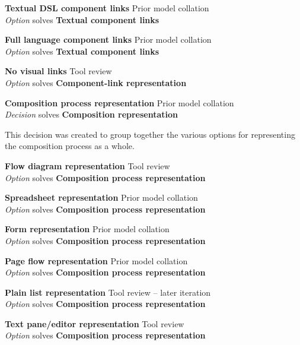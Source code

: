 \textbf{Textual DSL component links} \hfill Prior model collation \cite{Aghaee2012} \\ \emph{Option} \hfill solves \textbf{Textual component links}

\textbf{Full language component links} \hfill Prior model collation \cite{Fischer2009} \\ \emph{Option} \hfill solves \textbf{Textual component links}

\textbf{No visual links} \hfill Tool review \\ \emph{Option} \hfill solves \textbf{Component-link representation}
		
\textbf{Composition process representation} \hfill Prior model collation \\ \emph{Decision} \hfill solves \textbf{Composition representation}

This decision was created to group together the various options for representing the composition process as a whole.

\textbf{Flow diagram representation} \hfill Tool review \\ \emph{Option} \hfill solves \textbf{Composition process representation}

\textbf{Spreadsheet representation} \hfill Prior model collation \cite{Aghaee2012,Minhas2012,Fischer2009} \\ \emph{Option} \hfill solves \textbf{Composition process representation}


\textbf{Form representation} \hfill Prior model collation \cite{Aghaee2012} \\ \emph{Option} \hfill solves \textbf{Composition process representation}

\textbf{Page flow representation} \hfill Prior model collation \cite{Pietschmann2010} \\ \emph{Option} \hfill solves \textbf{Composition process representation}

\textbf{Plain list representation} \hfill Tool review  -- later iteration \\ \emph{Option} \hfill solves \textbf{Composition process representation}

\textbf{Text pane/editor representation} \hfill Tool review \\ \emph{Option} \hfill solves \textbf{Composition process representation}


